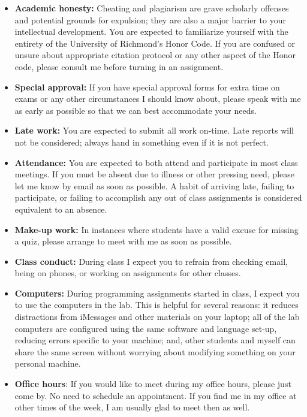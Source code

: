 \documentclass[12pt]{article}
\begin{document}
\begin{itemize}\setlength\itemsep{0em}
\item \textbf{Academic honesty:} Cheating and plagiarism are grave scholarly
offenses and potential grounds
for expulsion; they are also a major barrier to your intellectual development.
You are expected to familiarize yourself with the entirety of the
University of Richmond’s Honor Code. If you are confused or unsure about
appropriate citation protocol or any other aspect of the Honor code,
please consult me before turning in an assignment.
\item \textbf{Special approval:} If you have special approval forms for extra
time on exams or any other circumstances I should know about, please speak
with me as early as possible so that we can best accommodate your needs.
\item \textbf{Late work:} You are expected to submit all work on-time. Late
reports will not be considered; always hand in something even if it is not perfect.
\item \textbf{Attendance:} You are expected to both attend and participate in most
class meetings. If you must be absent due to illness or other pressing
need, please let me know by email as soon as possible. A habit of arriving
late, failing to participate, or failing to accomplish any out of class assignments
is considered equivalent to an absence.
\item \textbf{Make-up work:} In instances where students have a valid excuse for
missing a quiz, please arrange to meet with me as soon as possible.
\item \textbf{Class conduct:} During class I expect you to refrain from checking
email, being on phones, or working on assignments for other classes.
\item \textbf{Computers:} During programming assignments started in class, I expect you
to use the computers in the lab. This is helpful for several reasons: it
reduces distractions from iMessages and other materials on your laptop;
all of the lab computers are configured using the same software and language
set-up, reducing errors specific to your machine; and, other students and
myself can share the same screen without worrying about modifying something
on your personal machine.
\item \textbf{Office hours}: If you would like to meet during my office hours,
please just come by. No need to schedule an appointment. If you find me in
my office at other times of the week, I am usually glad to meet then as well.

\end{itemize}
\end{document}
